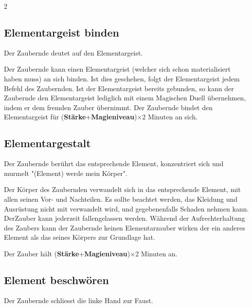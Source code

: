 \begin{multicols*}{2}


\subsection{Elementargeist binden}

Der Zaubernde deutet auf den Elementargeist.

Der Zaubernde kann einen Elementargeist (welcher sich schon materialisiert haben muss) an sich binden. Ist dies geschehen, folgt der Elementargeist jedem Befehl des Zaubernden. Ist der Elementargeist bereits gebunden, so kann der Zaubernde den Elementargeist lediglich mit einem Magischen Duell übernehmen, indem er dem fremden Zauber übernimmt. Der Zaubernde bindet den Elementargeist für (\textbf{Stärke}+\textbf{Magieniveau})×2 Minuten an sich.



\subsection{Elementargestalt}

Der Zaubernde berührt das entsprechende Element, konzentriert sich und murmelt "(Element) werde mein Körper".

Der Körper des Zaubernden verwandelt sich in das entsprechende Element, mit allen seinen Vor- und Nachteilen. Es sollte beachtet werden, das Kleidung und Ausrüstung nicht mit verwandelt wird, und gegebenenfalls Schaden nehmen kann. DerZauber kann jederzeit fallengelassen werden. Während der Aufrechterhaltung des Zaubers kann der Zaubernde keinen Elementarzauber wirken der ein anderes Element als das seines Körpers zur Grundlage hat.

Der Zauber hält (\textbf{Stärke}+\textbf{Magieniveau})×2 Minuten an.



\subsection{Element beschwören}

Der Zaubernde schliesst die linke Hand zur Faust.


\end{multicols*}
